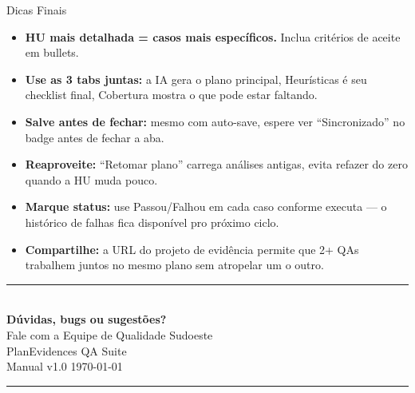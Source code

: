 \documentclass[aspectratio=169,12pt]{beamer}
\begin{document}
\begin{frame}{Dicas Finais}
  \begin{itemize}
    \item \textbf{HU mais detalhada = casos mais específicos.} Inclua critérios de aceite em bullets.
    \vspace{0.3em}
    \item \textbf{Use as 3 tabs juntas:} a IA gera o plano principal, Heurísticas é seu checklist final, Cobertura mostra o que pode estar faltando.
    \vspace{0.3em}
    \item \textbf{Salve antes de fechar:} mesmo com auto-save, espere ver \textcolor{peGreen}{``Sincronizado''} no badge antes de fechar a aba.
    \vspace{0.3em}
    \item \textbf{Reaproveite:} ``Retomar plano'' carrega análises antigas, evita refazer do zero quando a HU muda pouco.
    \vspace{0.3em}
    \item \textbf{Marque status:} use Passou/Falhou em cada caso conforme executa — o histórico de falhas fica disponível pro próximo ciclo.
    \vspace{0.3em}
    \item \textbf{Compartilhe:} a URL do projeto de evidência permite que 2+ QAs trabalhem juntos no mesmo plano sem atropelar um o outro.
  \end{itemize}
\end{frame}

\begin{frame}[plain]
  \begin{center}
    \vspace{2cm}
    {\color{peGreen}\rule{0.5\linewidth}{3pt}}\\[1.5em]
    {\Large\textbf{Dúvidas, bugs ou sugestões?}}\\[1em]
    {\large Fale com a Equipe de Qualidade Sudoeste}\\[2em]
    {\small\color{peMuted}PlanEvidences QA Suite\\ Manual v1.0 \quad\textbullet\quad \today}\\[2em]
    {\color{peGreen}\rule{0.5\linewidth}{2pt}}
  \end{center}
\end{frame}
\end{document}
